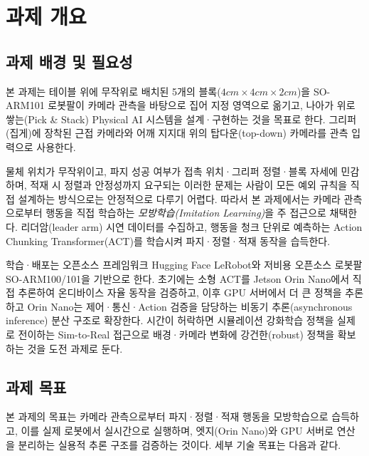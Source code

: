 \documentclass[titlepage]{pnureport}
\begin{document}
\maketitle

\tableofcontents
\clearpage
{}

\chapter{과제 개요}

\section{과제 배경 및 필요성}

본 과제는 테이블 위에 무작위로 배치된 5개의 블록($4cm \times 4cm \times 2cm$)을 SO-ARM101 로봇팔이 카메라 관측을 바탕으로 집어 지정 영역으로 옮기고, 나아가 위로 쌓는(Pick \& Stack) Physical AI 시스템을 설계·구현하는 것을 목표로 한다. 그리퍼(집게)에 장착된 근접 카메라와 어깨 지지대 위의 탑다운(top-down) 카메라를 관측 입력으로 사용한다. 

물체 위치가 무작위이고, 파지 성공 여부가 접촉 위치·그리퍼 정렬·블록 자세에 민감하며, 적재 시 정렬과 안정성까지 요구되는 이러한 문제는 사람이 모든 예외 규칙을 직접 설계하는 방식으로는 안정적으로 다루기 어렵다. 따라서 본 과제에서는 카메라 관측으로부터 행동을 직접 학습하는 \emph{모방학습(Imitation Learning)}을 주 접근으로 채택한다. 리더암(leader arm) 시연 데이터를 수집하고, 행동을 청크 단위로 예측하는 Action Chunking Transformer(ACT)를 학습시켜\cite{zhao2023act} 파지·정렬·적재 동작을 습득한다. 

학습·배포는 오픈소스 프레임워크 Hugging Face LeRobot\cite{lerobot,lerobot-tutorial}와 저비용 오픈소스 로봇팔 SO-ARM100/101\cite{soarm100,lerobot-so101}을 기반으로 한다. 초기에는 소형 ACT를 Jetson Orin Nano\cite{nvidia-jetson-orin}에서 직접 추론하여 온디바이스 자율 동작을 검증하고, 이후 GPU 서버에서 더 큰 정책을 추론하고 Orin Nano는 제어·통신·Action 검증을 담당하는 비동기 추론(asynchronous inference) 분산 구조\cite{lerobot-async}로 확장한다. 시간이 허락하면 시뮬레이션 강화학습 정책을 실제로 전이하는 Sim-to-Real\cite{lerobot-sim2real,maniskill3} 접근으로 배경·카메라 변화에 강건한(robust) 정책을 확보하는 것을 도전 과제로 둔다.

\section{과제 목표}

본 과제의 목표는 카메라 관측으로부터 파지·정렬·적재 행동을 모방학습으로 습득하고, 이를 실제 로봇에서 실시간으로 실행하며, 엣지(Orin Nano)와 GPU 서버로 연산을 분리하는 실용적 추론 구조를 검증하는 것이다. 세부 기술 목표는 다음과 같다.
\end{document}
